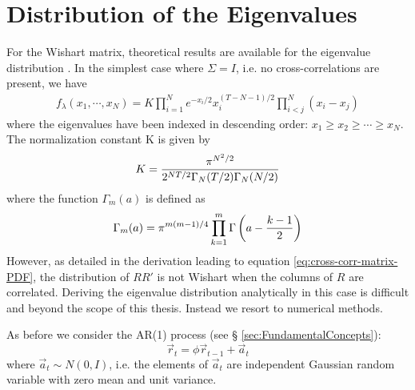 \documentclass{book}
\begin{document}
\section{Distribution of the Eigenvalues}\label{sec:GCC-numerical}
For the Wishart matrix, theoretical results are available for the
eigenvalue distribution \cite{Chiani2012}. In the simplest case where
$\Sigma = I$, i.e. no cross-correlations are present, we have
\begin{eqnarray*}
  f_{\lambda}(x_1, \cdots, x_N) = K \prod_{i=1}^N e^{-x_i/2}
  x_i^{(T-N-1)/2} \prod_{i<j}^N (x_i - x_j)
\end{eqnarray*}
where the eigenvalues have been indexed in descending order: $x_1 \geq
x_2 \geq \cdots \geq x_N$. The normalization constant K is given by
\begin{equation*}
  K = {\pi^{N^2/2} \over 2^{NT/2}\Gamma_N(T/2) \Gamma_N(N/2)}
\end{equation*}
where the function $\Gamma_m(a)$ is defined as
\begin{equation*}
  \Gamma_m(a) = \pi^{m(m-1)/4} \prod_{k=1}^m \Gamma\left(a - {k-1
      \over 2}\right)
\end{equation*}
However, as detailed in the derivation leading to equation
\ref{eq:cross-corr-matrix-PDF}, the distribution of $RR'$ is not
Wishart when the columns of $R$ are correlated. Deriving the
eigenvalue distribution analytically in this case is difficult and
beyond the scope of this thesis. Instead we resort to numerical
methods.

As before we consider the AR(1) process (see \S
\ref{sec:FundamentalConcepts}):
\begin{equation*}
  \vec{r}_t = \phi \vec{r}_{t-1} + \vec{a}_{t}
\end{equation*}
where $\vec{a}_t \sim N(0, I)$, i.e. the elements of $\vec{a}_t$ are
independent Gaussian random variable with zero mean and unit
variance.
\end{document}
